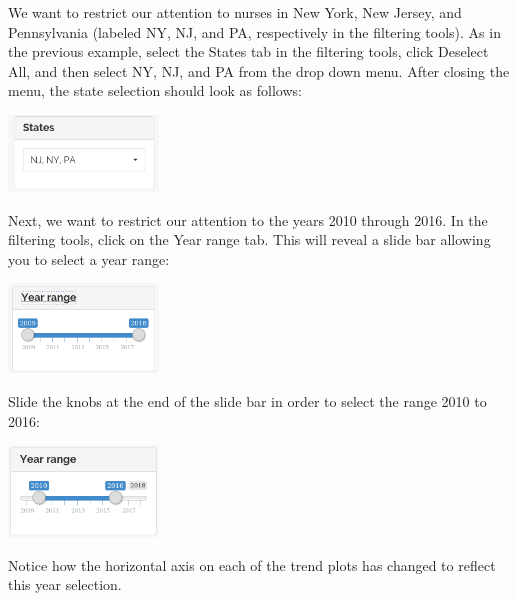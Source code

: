 \documentclass[letterpaper,12pt]{article}
\begin{document}
\begin{enumerate}
  We want to restrict our attention to nurses in New York, New Jersey,
  and Pennsylvania (labeled NY, NJ, and PA, respectively in the
  filtering tools). As in the previous example, select the States tab
  in the filtering tools, click Deselect All, and then select NY, NJ,
  and PA from the drop down menu. After closing the menu, the state
  selection should look as follows:
  \begin{center}
    \includegraphics[width=0.3\textwidth]{images/trends_ex3/state_selection.png}
  \end{center}
  Next, we want to restrict our attention to the years 2010 through
  2016. In the filtering tools, click on the Year range tab. This will
  reveal a slide bar allowing you to select a year range:
  \begin{center}
    \includegraphics[width=0.3\textwidth]{images/trends_ex3/year_selection.png}
  \end{center}
  Slide the knobs at the end of the slide bar in order to select the
  range 2010 to 2016:
  \begin{center}
    \includegraphics[width=0.3\textwidth]{images/trends_ex3/year_selection2.png}
  \end{center}
  Notice how the horizontal axis on each of the trend plots has
  changed to reflect this year selection.


\end{enumerate}
\end{document}
